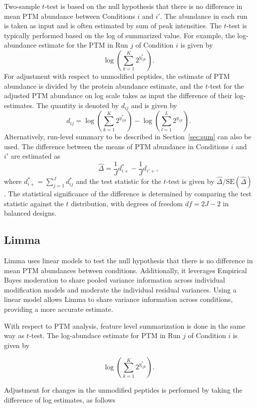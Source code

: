 \documentclass{mcp}
\def\secref#1{Section~\ref{#1}}
\begin{document}
Two-sample $t$-test is based on the null hypothesis that there is no difference in mean PTM abundance between Conditions $i$ and $i'$. The abundance in each run is taken as input and is often estimated by sum of peak intensities. The $t$-test is typically performed based on the log of summarized value. For example, the log-abundance estimate for the PTM in Run $j$ of Condition $i$ is given by
\[
\log \left( \sum_{k=1}^{K} 2^{y_{ijk}^{\ast}} \right).
\]
For adjustment with respect to unmodified peptides, the estimate of PTM abundance is divided by the protein abundance estimate, 
and the $t$-test for the adjusted PTM abundance on log scale takes as input the difference of their log-estimates.
The quantity is denoted by $d_{ij}$ and is given by
\[
d_{ij} = \log \left( \sum_{k=1}^{K} 2^{y_{ijk}^{\ast}} \right) - \log \left( \sum_{l=1}^{L} 2^{y_{ijl}} \right).
\]
Alternatively, run-level summary to be described in \secref{sec:sum} can also be used. The difference between the means of PTM abundance in Conditions $i$ and $i'$ are estimated as
\[
\hat{\Delta} = \frac{1}{J} d_{i+}^{\ast} - \frac{1}{J} d_{i'+},
\]
where $d_{i+}^{\ast} = \sum_{j=1}^{J} d_{ij}^{\ast}$ and the test statistic for the $t$-test is given by $\hat{\Delta} / \mathrm{SE}(\hat{\Delta})$. The statistical significance of the difference is determined by comparing the test statistic against the $t$ distribution, with degrees of freedom $df=2J-2$ in balanced designs.

\subsection{Limma}

Limma uses linear models to test the null hypothesis that there is no difference in mean PTM abundances between conditions. Additionally, it leverages Empirical Bayes moderation to share pooled variance information across individual modification models and moderate the individual residual variances. Using a linear model allows Limma to share variance information across conditions, providing a more accurate estimate.\cite{Ritchie_15a}

With respect to PTM analysis, feature level summarization is done in the same way as $t$-test. The log-abundace estimate for PTM in Run $j$ of Condition $i$ is given by 

\[
\log \left( \sum_{k=1}^{K} 2^{y_{ijk}^{\ast}} \right).
\]

Adjustment for changes in the unmodified peptides is performed by taking the difference of log estimates, as follows
\end{document}
